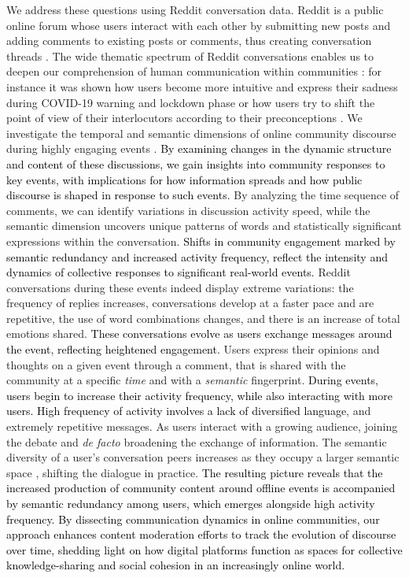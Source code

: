 \documentclass[fleqn,10pt]{wlscirep}
\newcommand{\new}[1]{\textcolor{black}{#1}}
\begin{document}
We address these questions using Reddit conversation data. 
Reddit is a public online forum whose users interact with each other by submitting new posts and adding comments to existing posts or comments, thus creating conversation threads \cite{choi_characterizing_2015}. 
The wide thematic spectrum of Reddit conversations enables us to deepen our comprehension of human communication within communities \cite{proferes2021studying}: for instance it was shown how users become more intuitive and express their sadness during COVID-19 warning and lockdown phase \cite{ashokkumar2021social} or how users try to shift the point of view of their interlocutors according to their preconceptions \cite{monti2022language}.
We investigate the temporal and semantic dimensions of online community discourse during highly engaging events \cite{sasahara2013quantifying,he2017measuring,szell_contraction_2014}.
\new{
By examining changes in the dynamic structure and content of these discussions, we gain insights into community responses to key events, with implications for how information spreads and how public discourse is shaped in response to such events.
}
By analyzing the time sequence of comments, we can identify variations in discussion activity speed, while the semantic dimension uncovers unique patterns of words and statistically significant expressions within the conversation.
\new{
Shifts in community engagement marked by semantic redundancy and increased activity frequency, reflect the intensity and dynamics of collective responses to significant real-world events.
}
Reddit conversations during these events indeed display extreme variations: the frequency of replies increases, conversations develop at a faster pace and are repetitive, the use of word combinations changes, and there is an increase of total emotions shared.
\new{
These conversations evolve as users exchange messages around the event, reflecting heightened engagement.
}
Users express their opinions and thoughts on a given event through a comment, that is shared with the community at a specific \emph{time} and with a \emph{semantic} fingerprint. 
\new{
During events, users begin to increase their activity frequency, while also interacting with more users. 
High frequency of activity involves a lack of diversified language}, and extremely repetitive messages.
As users interact with a growing audience, joining the debate and \emph{de facto} broadening the exchange of information.
The semantic diversity of a user's conversation peers increases as they occupy a larger semantic space \cite{gonzalez2008understanding,lombardo2022mobility}, shifting the dialogue in practice.
\new{
The resulting picture reveals that the increased production of community content around offline events is accompanied by  semantic redundancy among users, which emerges alongside high activity frequency.
By dissecting communication dynamics in online communities, our approach enhances content moderation efforts to track the evolution of discourse over time, shedding light on how digital platforms function as spaces for collective knowledge-sharing and social cohesion in an increasingly online world.
}
\end{document}
